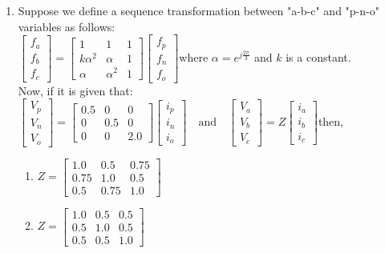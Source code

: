 \documentclass[journal]{IEEEtran}
\numberwithin{equation}{enumi}
\numberwithin{figure}{enumi}
\begin{document}
\begin{enumerate}
    \item Suppose we define a sequence transformation between "a-b-c" and "p-n-o" variables as follows:\\$\begin{bmatrix}f_a \\f_b \\f_c\end{bmatrix}=\begin{bmatrix}1 & 1 & 1 \\k\alpha^2 & \alpha & 1 \\\alpha & \alpha^2 & 1\end{bmatrix}\begin{bmatrix}f_p \\f_n \\f_o\end{bmatrix}$where $ \alpha = e^{j\frac{2\pi}{3}} $ and $ k $ is a constant.\\Now, if it is given that:$\begin{bmatrix}V_p \\V_n \\V_o\end{bmatrix}=\begin{bmatrix}
    0.5 & 0 & 0 \\
    0 & 0.5 & 0 \\
    0 & 0 & 2.0
    \end{bmatrix}\begin{bmatrix}i_p \\i_n \\i_o\end{bmatrix}\quad \text{and} \quad\begin{bmatrix}V_a \\V_b \\V_c\end{bmatrix}= Z\begin{bmatrix}i_a \\i_b \\i_c\end{bmatrix}$then,
    \begin{multicols}{2}
    \begin{enumerate}
        \item $ Z = \begin{bmatrix} 1.0 & 0.5 & 0.75 \\ 0.75 & 1.0 & 0.5 \\ 0.5 & 0.75 & 1.0 \end{bmatrix} $
        \item $ Z = \begin{bmatrix} 1.0 & 0.5 & 0.5 \\ 0.5 & 1.0 & 0.5 \\ 0.5 & 0.5 & 1.0 \end{bmatrix} $

\end{enumerate}
\end{multicols}
\end{enumerate}
\end{document}

